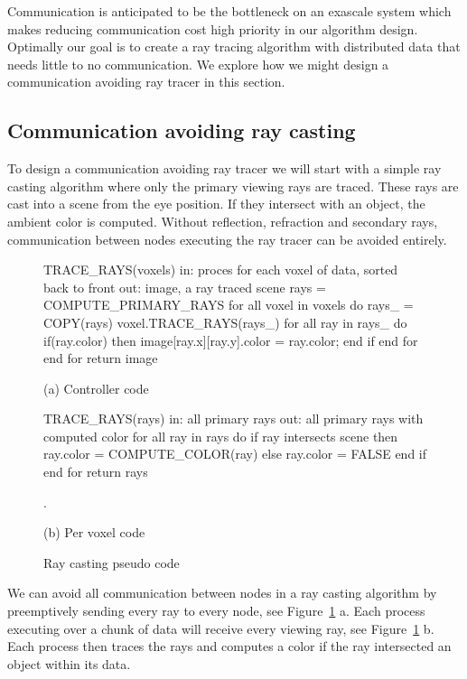 Communication is anticipated to be the bottleneck on an exascale system which
makes reducing communication cost high priority in our algorithm design.  
Optimally our goal is to create a ray tracing algorithm with distributed data 
that needs little to no communication.  We explore how we might design a 
communication avoiding ray tracer in this section.

\subsection{Communication avoiding ray casting}
\label{sec:ca-ray-casting}
To design a communication avoiding ray tracer we will start with a simple ray
casting algorithm where only the primary viewing rays are traced. These rays are 
cast into a scene from the eye position.  If they intersect with an object, the 
ambient color is computed.  Without reflection, refraction and secondary rays,
communication between nodes executing the ray tracer can be avoided entirely.

\begin{figure}[!htb]
\begin{algorithm}
TRACE_RAYS(voxels) 
  in: proces for each voxel of 
      data, sorted back to front
  out: image, a ray traced scene
  rays = COMPUTE_PRIMARY_RAYS
  for all voxel in voxels do
  rays_ = COPY(rays)
    voxel.TRACE_RAYS(rays_)
    for all ray in rays_ do
      if(ray.color) then
        image[ray.x][ray.y].color
         = ray.color;
      end if
    end for
  end for
return image
\end{algorithm}

(a) Controller code

\endminipage\hfill
{}
\begin{algorithm}
TRACE_RAYS(rays)
  in:  all primary rays
  out: all primary rays with 
       computed color
  for all ray in rays do
    if ray intersects scene then
      ray.color = COMPUTE_COLOR(ray)
    else
      ray.color = FALSE
    end if
  end for
return rays



.
\end{algorithm}

(b) Per voxel code

\endminipage\hfill
\caption{Ray casting pseudo code}
\label{fig:ray_caster}
\end{figure}

We can avoid all communication between nodes in a ray casting algorithm by 
preemptively sending every ray to every node, see Figure~\ref{fig:ray_caster} a.  
Each process executing over a chunk of data will receive every viewing ray, see 
Figure~\ref{fig:ray_caster} b.  Each process then traces the rays and computes a
color if the ray intersected an object within its data.  

